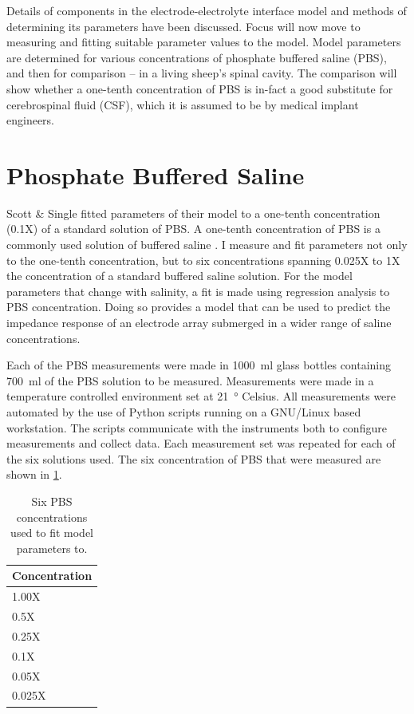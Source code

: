 
Details of components in the electrode-electrolyte interface model and methods of determining its parameters have been discussed.
Focus will now move to measuring and fitting suitable parameter values to the model.
Model parameters are determined for various concentrations of phosphate buffered saline (PBS), and then for comparison -- in a living sheep's spinal cavity.
The comparison will show whether a one-tenth concentration of PBS is in-fact a good substitute for cerebrospinal fluid (CSF), which it is assumed to be by medical implant engineers.

\section{Phosphate Buffered Saline}
\label{sect:pbs_measurements}

    Scott \& Single fitted parameters of their model to a one-tenth concentration (0.1X) of a standard solution of PBS.
    A one-tenth concentration of PBS is a commonly used solution of buffered saline \cite{Scott2014}.
    I measure and fit parameters not only to the one-tenth concentration, but to six concentrations spanning 0.025X to 1X the concentration of a standard buffered saline solution.
    For the model parameters that change with salinity, a fit is made using regression analysis to PBS concentration.
    Doing so provides a model that can be used to predict the impedance response of an electrode array submerged in a wider range of saline concentrations.

    Each of the PBS measurements were made in \SI{1000}{\milli\litre} glass bottles containing \SI{700}{\milli\litre} of the PBS solution to be measured.
    Measurements were made in a temperature controlled environment set at \SI{21}{\degree} Celsius.
    All measurements were automated by the use of Python scripts running on a GNU/Linux based workstation.
    The scripts communicate with the instruments both to configure measurements and collect data.
    Each measurement set was repeated for each of the six solutions used.
    The six concentration of PBS that were measured are shown in \cref{tab:pt2-PBS_concentrations}.
    \begin{table}
      \centering
      \begin{tabular}{l}
        Concentration\\
        \hline
        1.00X\\
        0.5X\\
        0.25X\\
        0.1X\\
        0.05X\\
        0.025X\\
      \end{tabular}
      \caption{\label{tab:pt2-PBS_concentrations}Six PBS concentrations used to fit model parameters to.}
    \end{table}

